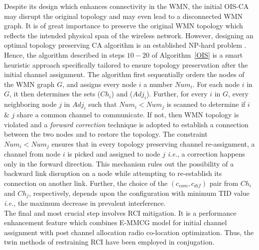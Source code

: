 \documentclass[conference]{IEEEtran}
\begin{document}
Despite its design which enhances connectivity in the WMN, the initial OIS-CA may disrupt the original topology and may even lead to a disconnected WMN graph. It is of great importance to preserve the original WMN topology which reflects the intended physical span of the wireless network. However, designing an optimal topology preserving CA algorithm is an established NP-hard problem \cite{TopoNPHard}. Hence, the algorithm described in steps $10-20$ of Algorithm~\ref{OIS} is a smart heuristic approach specifically tailored to ensure topology preservation after the initial channel assignment. The algorithm first sequentially orders the nodes of the WMN graph $G$, and assigns every node $i$ a number $Num_i$. For each node $i$ in $G$, it then determines the sets ($Ch_i$) and ($Adj_i$). Further, for every $i$ in $G$, every neighboring node $j$ in $Adj_i$ such that $Num_i<Num_j$ is scanned to determine if $i$ $\&$ $j$ share a common channel to communicate. If not, then WMN topology is violated and a \textit{
forward correction} technique is adopted to establish a connection between the two nodes and to restore the topology. The constraint $Num_i<Num_j$ ensures that in every topology preserving channel re-assignment, a channel from node $i$ is picked and assigned to node $j$ \emph{i.e.}, a correction happens only in the forward direction. This mechanism rules out the possibility of a backward link disruption on a node while attempting to re-establish its connection on another link. Further, the choice of the $(c_{com},c_{dif})$ pair from $Ch_{i}$ and $Ch_{j}$, respectively, depends upon the configuration with minimum TID value \emph{i.e.}, the maximum decrease in prevalent interference.\\
The final and most crucial step involves RCI mitigation. It is a performance enhancement feature which combines E-MMCG model for initial channel assignment with post channel allocation radio co-location optimization. Thus, the twin methods of restraining RCI have been employed in conjugation.
\renewcommand{\algorithmicrequire}{\textbf{Input:}}
\renewcommand{\algorithmicensure}{\textbf{Output:}}
\end{document}
